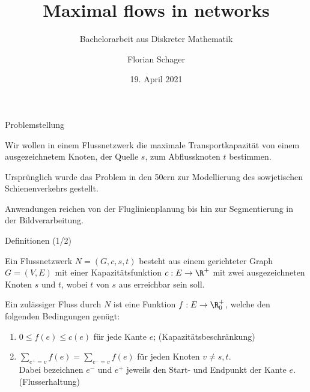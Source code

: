 \documentclass[aspectratio=169]{beamer}
\title[Maximum Flow Problem]{Maximal flows in networks}
\subtitle{Bachelorarbeit aus Diskreter Mathematik}
\author[F. Schager]{Florian Schager}
\institute[TU Wien]{TU Wien, Vienna, Austria}
\date{19. April 2021}
\begin{document}
\begin{frame}
    \titlepage
\end{frame}


\begin{frame}{Problemstellung}
  \begin{problem*}
    Wir wollen in einem Flussnetzwerk die maximale Transportkapazität
    von einem ausgezeichnetem Knoten, der Quelle $s$, zum Abflussknoten $t$ bestimmen.

    Ursprünglich wurde das Problem in den 50ern zur Modellierung des sowjetischen Schienenverkehrs gestellt.

    Anwendungen reichen von der Fluglinienplanung bis hin zur Segmentierung in der
    Bildverarbeitung.
  \end{problem*}
\end{frame}


\begin{frame}{Definitionen (1/2)}
  \begin{definition*}[Flussnetzwerk]
    Ein Flussnetzwerk $N = (G,c,s,t)$ besteht aus einem gerichteter Graph $G = (V,E)$ mit einer
    Kapazitätsfunktion $c: E \to \R^+$ mit zwei ausgezeichneten Knoten $s$ und $t$,
    wobei $t$ von $s$ aus erreichbar sein soll.
  \end{definition*}

  \pause

  \begin{definition*}[Fluss]
    Ein zulässiger Fluss durch $N$ ist eine Funktion $f: E \to \R_0^+$, welche
    den folgenden Bedingungen genügt:
    \begin{enumerate}
      \item<3-> $0 \leq f(e) \leq c(e)$ für jede Kante $e$; \quad (Kapazitätsbeschränkung)
      \item<4> $\sum_{e^+ = v} f(e) = \sum_{e^- = v} f(e)$ für jeden Knoten $v \neq s,t$. \\
      Dabei bezeichnen $e^-$ und $e^+$ jeweils den Start- und Endpunkt der Kante $e$.
      \quad (Flusserhaltung)
    \end{enumerate}
  \end{definition*}
\end{frame}
\end{document}
